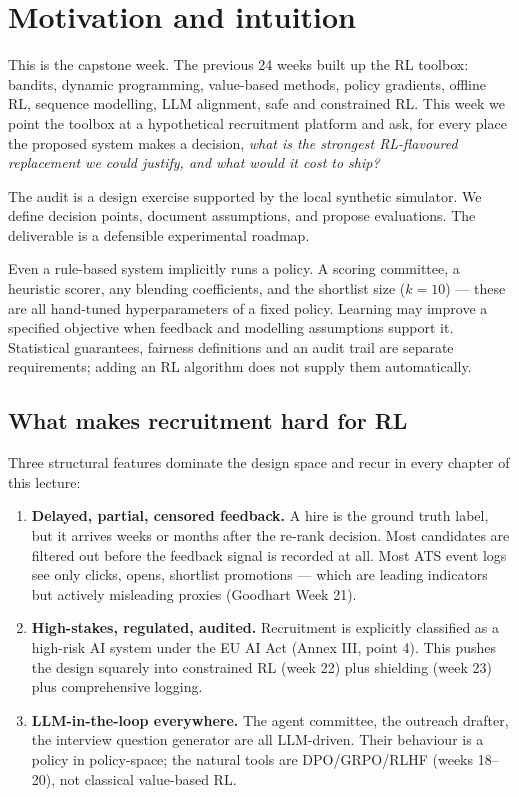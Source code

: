 \documentclass[11pt,oneside]{scrbook}
\begin{document}
\chapter{Motivation and intuition}

This is the capstone week. The previous 24 weeks built up the RL toolbox:
bandits, dynamic programming, value-based methods, policy gradients,
offline RL, sequence modelling, LLM alignment, safe and constrained RL.
This week we point the toolbox at a hypothetical recruitment platform
and ask, for every
place the proposed system makes a decision, \emph{what is the strongest
RL-flavoured replacement we could justify, and what would it cost to ship?}

The audit is a design exercise supported by the local synthetic simulator.
We define decision points, document assumptions, and propose evaluations.
The deliverable is a defensible experimental roadmap.

\begin{intuition}
Even a rule-based system implicitly runs a policy. A scoring committee,
a heuristic scorer, any blending coefficients, and the shortlist size
($k=10$) --- these are all hand-tuned hyperparameters of a fixed
policy. Learning may improve a specified objective when feedback and modelling assumptions support it. Statistical guarantees, fairness definitions and an audit trail are separate requirements; adding an RL algorithm does not supply them automatically.
\end{intuition}

\section{What makes recruitment hard for RL}

Three structural features dominate the design space and recur in every
chapter of this lecture:

\begin{enumerate}
  \item \textbf{Delayed, partial, censored feedback.} A hire is the
        ground truth label, but it arrives weeks or months after the
        re-rank decision. Most candidates are filtered out before the
        feedback signal is recorded at all. Most ATS event logs see only
        clicks, opens, shortlist promotions --- which are leading
        indicators but actively misleading proxies (Goodhart Week 21).
  \item \textbf{High-stakes, regulated, audited.} Recruitment is
        explicitly classified as a high-risk AI system under the EU AI
        Act (Annex III, point 4). This pushes the design squarely into
        constrained RL (week 22) plus shielding (week 23) plus
        comprehensive logging.
  \item \textbf{LLM-in-the-loop everywhere.} The agent committee, the
        outreach drafter, the interview question generator are all
        LLM-driven. Their behaviour is a policy in policy-space; the
        natural tools are DPO/GRPO/RLHF (weeks 18--20), not classical
        value-based RL.
\end{enumerate}
\end{document}

